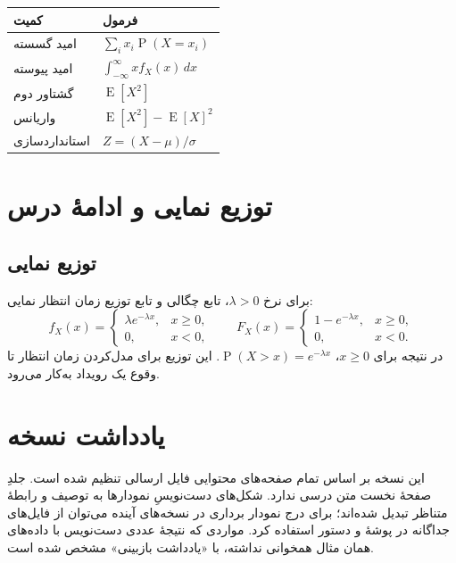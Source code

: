 \documentclass[12pt,a4paper,oneside]{book}
\newcommand{\Prob}{\operatorname{P}}
\newcommand{\E}{\operatorname{E}}
\begin{document}
\begin{center}\small\begin{tabular}{p{44mm}p{85mm}}\toprule
کمیت & فرمول \\ \midrule
امید گسسته & $\sum_i x_i\Prob(X=x_i)$ \\
امید پیوسته & $\int_{-\infty}^{\infty}xf_X(x)\,dx$ \\
گشتاور دوم & $\E[X^2]$ \\
واریانس & $\E[X^2]-\E[X]^2$ \\
استانداردسازی & $Z=(X-\mu)/\sigma$ \\ \bottomrule
\end{tabular}\end{center}

\chapter{توزیع نمایی و ادامهٔ درس}
\section{توزیع نمایی}
برای نرخ $\lambda>0$، تابع چگالی و تابع توزیع زمان انتظار نمایی:
\begin{equation}
f_X(x)=\begin{cases}\lambda e^{-\lambda x},&x\geq0,\\0,&x<0,\end{cases}
\qquad
F_X(x)=\begin{cases}1-e^{-\lambda x},&x\geq0,\\0,&x<0.\end{cases}
\end{equation}
در نتیجه برای $x\geq0$، $\Prob(X>x)=e^{-\lambda x}$. این توزیع برای مدل‌کردن زمان انتظار تا وقوع یک رویداد به‌کار می‌رود.


\backmatter
\chapter*{یادداشت نسخه}
این نسخه بر اساس تمام صفحه‌های محتوایی فایل ارسالی تنظیم شده است. جلدِ صفحهٔ نخست متن درسی ندارد. شکل‌های دست‌نویسِ نمودارها به توصیف و رابطهٔ متناظر تبدیل شده‌اند؛ برای درج نمودار برداری در نسخه‌های آینده می‌توان از فایل‌های جداگانه در پوشهٔ  و دستور  استفاده کرد. مواردی که نتیجهٔ عددی دست‌نویس با داده‌های همان مثال همخوانی نداشته، با «یادداشت بازبینی» مشخص شده است.
\end{document}
